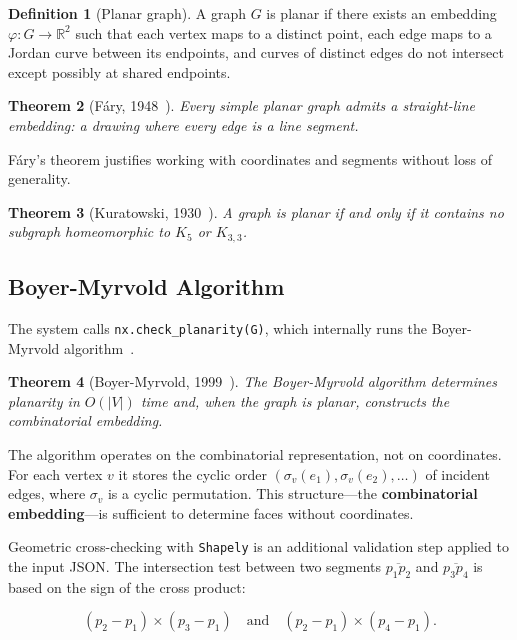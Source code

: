 \documentclass[12pt,letterpaper]{article}
\theoremstyle{plain}
\newtheorem{theorem}{Theorem}[section]
\theoremstyle{definition}
\newtheorem{definition}[theorem]{Definition}
\theoremstyle{remark}
\begin{document}
\begin{definition}[Planar graph]
A graph $G$ is planar if there exists an embedding $\varphi: G \to \mathbb{R}^2$
such that each vertex maps to a distinct point, each edge maps to a Jordan curve
between its endpoints, and curves of distinct edges do not intersect except
possibly at shared endpoints.
\end{definition}

\begin{theorem}[F\'ary, 1948~\cite{fary1948}]
Every simple planar graph admits a straight-line embedding: a drawing where
every edge is a line segment.
\end{theorem}

F\'ary's theorem justifies working with coordinates and segments without loss of
generality.

\begin{theorem}[Kuratowski, 1930~\cite{kuratowski1930}]
A graph is planar if and only if it contains no subgraph homeomorphic to $K_5$
or $K_{3,3}$.
\end{theorem}

\subsection{Boyer-Myrvold Algorithm}

The system calls \texttt{nx.check\_planarity(G)}, which internally runs the
Boyer-Myrvold algorithm~\cite{boyermyrvold1999}.

\begin{theorem}[Boyer-Myrvold, 1999~\cite{boyermyrvold1999}]
The Boyer-Myrvold algorithm determines planarity in $O(|V|)$ time and, when the
graph is planar, constructs the combinatorial embedding.
\end{theorem}

The algorithm operates on the combinatorial representation, not on coordinates.
For each vertex $v$ it stores the cyclic order $(\sigma_v(e_1), \sigma_v(e_2),
\ldots)$ of incident edges, where $\sigma_v$ is a cyclic permutation. This
structure---the \textbf{combinatorial embedding}---is sufficient to determine
faces without coordinates.

Geometric cross-checking with \texttt{Shapely} is an additional validation step
applied to the input JSON. The intersection test between two segments
$\overline{p_1 p_2}$ and $\overline{p_3 p_4}$ is based on the sign of the
cross product:

\begin{equation}
(p_2 - p_1) \times (p_3 - p_1) \quad \text{and} \quad (p_2 - p_1) \times (p_4 - p_1).
\end{equation}
\end{document}
